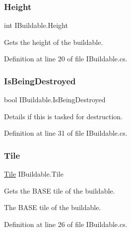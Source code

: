 \subsubsection{\texorpdfstring{Height}{Height}}
{\footnotesize\ttfamily int I\+Buildable.\+Height\hspace{0.3cm}{\ttfamily [get]}}



Gets the height of the buildable. 



Definition at line 20 of file I\+Buildable.\+cs.

\mbox{\label{interface_i_buildable_a87361d1de41fda5ad8053a0053ea1b11}} 
\subsubsection{\texorpdfstring{Is\+Being\+Destroyed}{IsBeingDestroyed}}
{\footnotesize\ttfamily bool I\+Buildable.\+Is\+Being\+Destroyed\hspace{0.3cm}{\ttfamily [get]}}



Details if this is tasked for destruction. 



Definition at line 31 of file I\+Buildable.\+cs.

\mbox{\label{interface_i_buildable_ad5ced6a828603f1c03afbfbb922285e1}} 
\subsubsection{\texorpdfstring{Tile}{Tile}}
{\footnotesize\ttfamily \hyperlink{class_tile}{Tile} I\+Buildable.\+Tile\hspace{0.3cm}{\ttfamily [get]}}



Gets the B\+A\+SE tile of the buildable. 

The B\+A\+SE tile of the buildable.

Definition at line 26 of file I\+Buildable.\+cs.

\mbox{\label{interface_i_buildable_aaf39e1c6e66f8afa6d8aab0806d65309}} 
